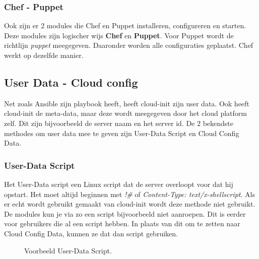 \subsubsection{Chef - Puppet}
Ook zijn er 2 modules die Chef en Puppet installeren, configureren en starten. Deze modules zijn logischer wijs \textbf{Chef} en \textbf{Puppet}. Voor Puppet wordt de richtlijn \textit{puppet} meegegeven. Daaronder worden alle configuraties geplaatst. Chef werkt op dezelfde manier.

\subsection{User Data - Cloud config}
Net zoals Ansible zijn playbook heeft, heeft cloud-init zijn user data. Ook heeft cloud-init de meta-data, maar deze wordt meegegeven door het cloud platform zelf. Dit zijn bijvoorbeeld de server naam en het server id. De 2 bekendste methodes om user data mee te geven zijn User-Data Script en Cloud Config Data. 

\subsubsection{User-Data Script}
Het User-Data script een Linux script dat de server overloopt voor dat hij opstart. Het moet altijd beginnen met \textit{!\#} of \textit{Content-Type: text/x-shellscript}. Als er echt wordt gebruikt gemaakt van cloud-init wordt deze methode niet gebruikt. De modules kun je via zo een script bijvoorbeeld niet aanroepen. Dit is eerder voor gebruikers die al een script hebben. In plaats van dit om te zetten naar Cloud Config Data, kunnen ze dat dan script gebruiken.
\begin{figure}[!htb]
	\caption{Voorbeeld User-Data Script.}
	\label{fig:udatascript}
\end{figure}
\newpage
